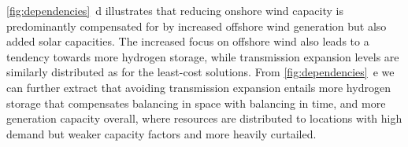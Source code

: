 \cref{fig:dependencies}~d illustrates that reducing onshore wind capacity is
predominantly compensated for by increased offshore wind generation but also
added solar capacities. The increased focus on offshore wind also leads to a
tendency towards more hydrogen storage, while transmission expansion levels are
similarly distributed as for the least-cost solutions. From
\cref{fig:dependencies}~e we can further extract that avoiding
transmission expansion entails more hydrogen storage that compensates balancing
in space with balancing in time, and more generation capacity overall, where
resources are distributed to locations with high demand but weaker capacity
factors and more heavily curtailed.
